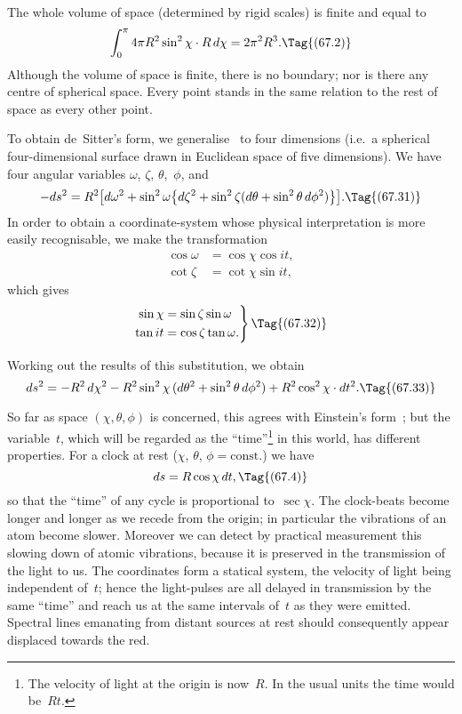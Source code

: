 \documentclass[12pt]{book}
\begin{document}
The whole volume of space (determined by rigid scales) is finite and equal
to
\[
\int_{0}^{\pi} 4\pi R^{2} \sin^{2}\chi \cdot R\, d\chi = 2\pi^{2} R^{3}.
\Tag{(67.2)}
\]
Although the volume of space is finite, there is no boundary; nor is there any
centre of spherical space. Every point stands in the same relation to the rest
of space as every other point.

To obtain de~Sitter's form, we generalise~ to four dimensions (i.e.\ a
spherical four-dimensional surface drawn in Euclidean space of five dimensions).
We have four angular variables $\omega$, $\zeta$, $\theta$,~$\phi$, and
\[
-ds^{2} = R^{2} \bigl[d\omega^{2}
  + \sin^{2}\omega \bigl\{d\zeta^{2}
  + \sin^{2}\zeta (d\theta + \sin^{2}\theta\, d\phi^{2})\bigr\}\bigr].
\Tag{(67.31)}
\]
In order to obtain a coordinate-system whose physical interpretation is more
easily recognisable, we make the transformation
\begin{align*}
  \cos\omega &= \cos\chi \cos it, \\
  \cot\zeta &= \cot\chi \sin it,
\end{align*}
which gives
\[
\left.
\begin{aligned}
  \sin\chi &= \sin\zeta \sin\omega\\
  \tan it &= \cos\zeta \tan\omega.
\end{aligned}
\right\}
\Tag{(67.32)}
\]

Working out the results of this substitution, we obtain
\[
ds^{2} = -R^{2}\, d\chi^{2} - R^{2} \sin^{2}\chi\, (d\theta^{2} + \sin^{2}\theta\, d\phi^{2})
+ R^{2} \cos^{2}\chi \cdot dt^{2}.
\Tag{(67.33)}
\]

So far as space $(\chi, \theta, \phi)$ is concerned, this agrees with Einstein's form~;
but the variable~$t$, which will be regarded as the ``time''\footnote
  {The velocity of light at the origin is now~$R$. In the usual units the time would be~$Rt$.}
in this
world, has different properties. For a clock at rest ($\chi$, $\theta$, $\phi = \text{const.}$) we have
\[
ds = R\cos\chi\, dt,
\Tag{(67.4)}
\]
%
%
%
so that the ``time'' of any cycle is proportional to~$\sec\chi$. The clock-beats
become longer and longer as we recede from the origin; in particular the
vibrations of an atom become slower. Moreover we can detect by practical
measurement this slowing down of atomic vibrations, because it is preserved
in the transmission of the light to us. The coordinates  form a statical
system, the velocity of light being independent of~$t$; hence the light-pulses
are all delayed in transmission by the same ``time'' and reach us at the same
intervals of~$t$ as they were emitted. Spectral lines emanating from distant
%
%
%
sources at rest should consequently appear displaced towards the red.
\end{document}
